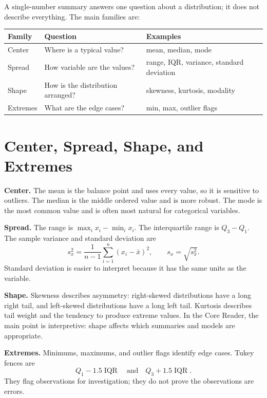 {A single-number summary answers one question about a distribution; it does not describe everything.  The main families are:
\begin{center}
\begin{tabular}{p{}p{}p{}}
\toprule
\textbf{Family} & \textbf{Question} & \textbf{Examples} \\
\midrule
Center & Where is a typical value? & mean, median, mode \\
Spread & How variable are the values? & range, IQR, variance, standard deviation \\
Shape & How is the distribution arranged? & skewness, kurtosis, modality \\
Extremes & What are the edge cases? & min, max, outlier flags \\
\bottomrule
\end{tabular}
\end{center}

\section{Center, Spread, Shape, and Extremes}

\textbf{Center.} The mean is the balance point and uses every value, so it is sensitive to outliers.  The median is the middle ordered value and is more robust.  The mode is the most common value and is often most natural for categorical variables.

\textbf{Spread.} The range is $\max_i x_i-\min_i x_i$.  The interquartile range is $Q_3-Q_1$.  The sample variance and standard deviation are
\begin{equation}
  s_x^2=\frac{1}{n-1}\sum_{i=1}^n (x_i-\bar{x})^2,
  \qquad
  s_x=\sqrt{s_x^2}.
  \label{eq:ch4-sample-variance}
\end{equation}
Standard deviation is easier to interpret because it has the same units as the variable.

\textbf{Shape.} Skewness describes asymmetry: right-skewed distributions have a long right tail, and left-skewed distributions have a long left tail.  Kurtosis describes tail weight and the tendency to produce extreme values.  In the Core Reader, the main point is interpretive: shape affects which summaries and models are appropriate.

\textbf{Extremes.} Minimums, maximums, and outlier flags identify edge cases.  Tukey fences are
\begin{equation}
  Q_1-1.5\operatorname{IQR}
  \quad\text{and}\quad
  Q_3+1.5\operatorname{IQR}.
  \label{eq:ch4-tukey-fences}
\end{equation}
They flag observations for investigation; they do not prove the observations are errors.

}
